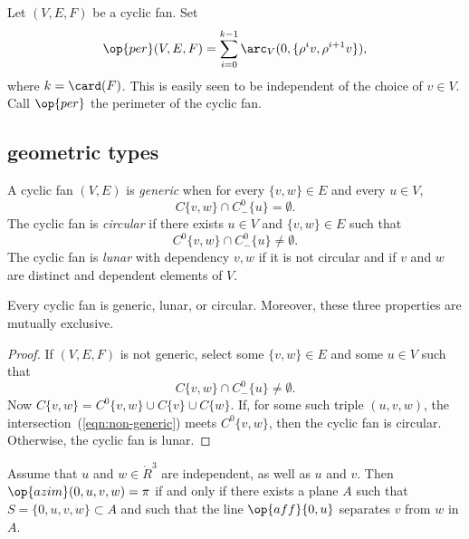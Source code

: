\begin{definition}[perimeter]\label{lemma:perim}
Let $(V,E,F)$ be a cyclic fan.    Set
$$
\op{per}(V,E,F) = \sum_{i=0}^{k-1} \arc_V(0,\{\rho^i v,\rho^{i+1} v\}), 
$$
where  $k=\card(F)$.
This is easily seen to be independent of the choice of $v\in V$.  Call $\op{per}$ the perimeter of the cyclic fan.
\end{definition}
%
%
%

\subsection{geometric types}\label{sec:types}

\begin{definition}
A cyclic fan $(V,E)$ is {\it generic} when for every $\{v,w\}\in E$
and every $u\in V$, 
$$
C\{v,w\}\cap C^0_-\{u\} = \emptyset.
$$
The cyclic fan is {\it circular} if there exists $u\in V$ and $\{v,w\}\in E$ such that 
$$
C^0\{v,w\}\cap C^0_-\{u\}\ne \emptyset.
$$
The cyclic fan is {\it lunar} with dependency $v,w$ if it is not circular and if $v$ and $w$ are distinct and dependent elements of $V$.
\end{definition}
%
%
%

\begin{lemma} Every cyclic fan is
generic, lunar, or circular.  Moreover, these three properties are mutually exclusive.
\end{lemma}
%
%
%
%
%

\begin{proof} If $(V,E,F)$ is not generic,  select some $\{v,w\}\in E$
and some $u\in V$ such that
\begin{equation}\label{eqn:non-generic}
C\{v,w\}\cap C^0_-\{u\} \ne \emptyset.
\end{equation}
Now $C\{v,w\} = C^0\{v,w\} \cup C\{v\}\cup C\{w\}$.  
If, for some such triple $(u,v,w)$, the intersection~(\ref{eqn:non-generic}) meets $C^0\{v,w\}$, then the cyclic fan is circular.  
Otherwise, the cyclic fan is lunar. 
\end{proof}

\begin{lemma}  \label{lemma:coplanar}
Assume that $u$ and $w\in\ring{R}^3$ are independent, as well as $u$ and $v$.  Then $\op{azim}(0,u,v,w)=\pi$
if and only if there exists a plane $A$ such that
$S=\{0,u,v,w\}\subset A$ and such that the line $\op{aff}\{0,u\}$ separates $v$ from $w$ in $A$.
\end{lemma}

